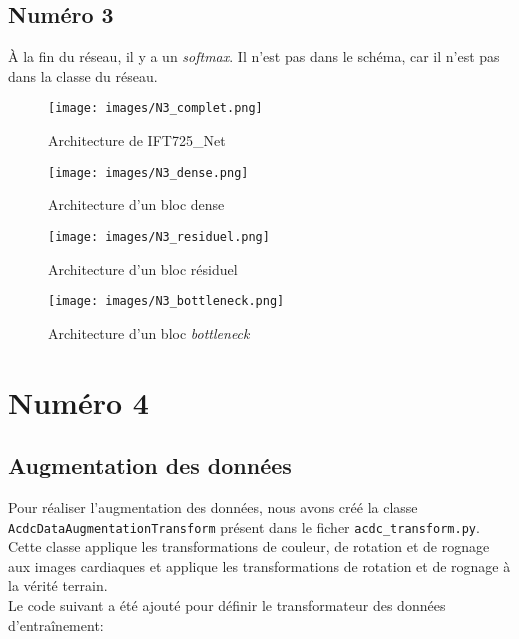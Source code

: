 \begin{landscape}
    \section{Numéro 3}
        À la fin du réseau, il y a un \textit{softmax}. Il n'est pas dans le schéma, car il n'est pas dans la classe du réseau.
        \begin{figure}[H]
            \centering 
            \texttt{[image: images/N3\_complet.png]}
            \caption{Architecture de IFT725\_Net}
        \end{figure}
    
        \begin{figure}[H]
            \centering 
            \texttt{[image: images/N3\_dense.png]}
            \caption{Architecture d'un bloc dense}
        \end{figure}
    
        \begin{figure}[H]
            \centering 
            \texttt{[image: images/N3\_residuel.png]}
            \caption{Architecture d'un bloc résiduel}
        \end{figure}
    
        \begin{figure}[H]
            \centering 
            \texttt{[image: images/N3\_bottleneck.png]}
            \caption{Architecture d'un bloc \textit{bottleneck}}
        \end{figure}    
\end{landscape}

\pagebreak
\section{Numéro 4}
\subsection{Augmentation des données}
    Pour réaliser l'augmentation des données, nous avons créé la classe \texttt{AcdcDataAugmentationTransform} présent dans le ficher \texttt{acdc\_transform.py}. Cette classe applique les transformations de couleur, de rotation et de rognage aux images cardiaques et applique les transformations de rotation et de rognage à la vérité terrain.\\
    
    Le code suivant a été ajouté pour définir le transformateur des données d'entraînement: \\
    

